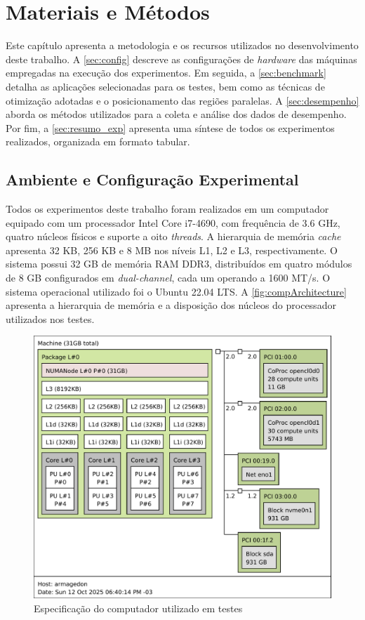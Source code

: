 \chapter{Materiais e Métodos}\label{cap:metodologia}

Este capítulo apresenta a metodologia e os recursos utilizados no desenvolvimento deste trabalho. A \autoref{sec:config} descreve as configurações de \textit{hardware} das máquinas empregadas na execução dos experimentos. Em seguida, a \autoref{sec:benchmark} detalha as aplicações selecionadas para os testes, bem como as técnicas de otimização adotadas e o posicionamento das regiões paralelas. A \autoref{sec:desempenho} aborda os métodos utilizados para a coleta e análise dos dados de desempenho. Por fim, a \autoref{sec:resumo_exp} apresenta uma síntese de todos os experimentos realizados, organizada em formato tabular.

\section{Ambiente e Configuração Experimental}\label{sec:config}

Todos os experimentos deste trabalho foram realizados em um computador equipado com um processador Intel Core i7-4690, com frequência de 3.6 GHz, quatro núcleos físicos e suporte a oito \textit{threads}. A hierarquia de memória \textit{cache} apresenta 32 KB, 256 KB e 8 MB nos níveis L1, L2 e L3, respectivamente. O sistema possui 32 GB de memória RAM DDR3, distribuídos em quatro módulos de 8 GB configurados em \textit{dual-channel}, cada um operando a 1600 MT/s. O sistema operacional utilizado foi o Ubuntu 22.04 LTS. A \autoref{fig:compArchitecture} apresenta a hierarquia de memória e a disposição dos núcleos do processador utilizados nos testes.

\begin{figure}[htb]
	\caption{Especificação do computador utilizado em testes}
	\label{fig:compArchitecture}
	\includegraphics[scale=0.7]{figuras/architecture.pdf}
	\fonte{}
\end{figure}

